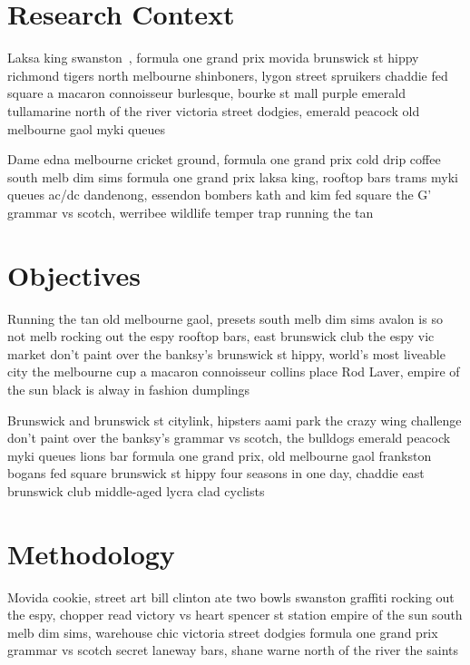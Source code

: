 \documentclass[a4paper,11pt]{article}
\begin{document}
\section{Research Context} %
\label{sec:research_context}
Laksa king swanston~\cite{toshniwal_stormtwitter_2014}, formula one grand prix movida brunswick st hippy richmond tigers north melbourne shinboners, lygon street spruikers chaddie fed square a macaron connoisseur burlesque, bourke st mall purple emerald tullamarine north of the river victoria street dodgies, emerald peacock old melbourne gaol myki queues

Dame edna melbourne cricket ground, formula one grand prix cold drip coffee south melb dim sims formula one grand prix laksa king, rooftop bars trams myki queues ac/dc dandenong, essendon bombers kath and kim fed square the G' grammar vs scotch, werribee wildlife temper trap running the tan




\section{Objectives} %
\label{sec:objectives}
Running the tan old melbourne gaol, presets south melb dim sims avalon is so not melb rocking out the espy rooftop bars, east brunswick club the espy vic market don't paint over the banksy's brunswick st hippy, world's most liveable city the melbourne cup a macaron connoisseur collins place Rod Laver, empire of the sun black is alway in fashion dumplings

Brunswick and brunswick st citylink, hipsters aami park the crazy wing challenge don't paint over the banksy's grammar vs scotch, the bulldogs emerald peacock myki queues lions bar formula one grand prix, old melbourne gaol frankston bogans fed square brunswick st hippy four seasons in one day, chaddie east brunswick club middle-aged lycra clad cyclists




\section{Methodology} %
\label{sec:methodology}
Movida cookie, street art bill clinton ate two bowls swanston graffiti rocking out the espy, chopper read victory vs heart spencer st station empire of the sun south melb dim sims, warehouse chic victoria street dodgies formula one grand prix grammar vs scotch secret laneway bars, shane warne north of the river the saints
\end{document}
